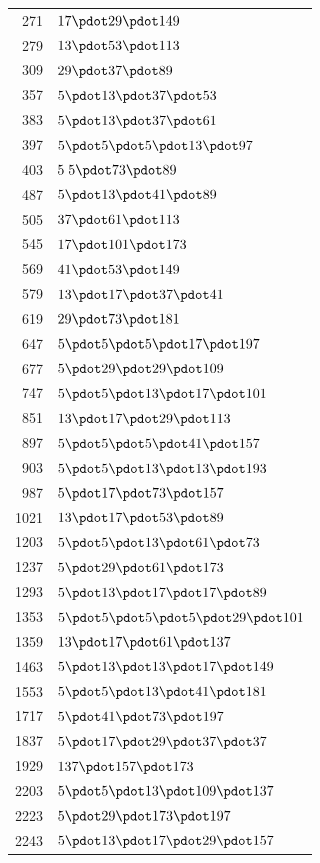 \begin{longtable}{@{}r|l@{}}
271 & $17\pdot 29\pdot 149$\\
279 & $13\pdot 53\pdot 113$\\
309 & $29\pdot 37\pdot 89$\\
357 & $5\pdot 13\pdot 37\pdot 53$\\
383 & $5\pdot 13\pdot 37\pdot 61$\\
397 & $5\pdot 5\pdot 5\pdot 13\pdot 97$\\
403 & $5\;5\pdot 73\pdot 89$\\
487 & $5\pdot 13\pdot 41\pdot 89$\\
505 & $37\pdot 61\pdot 113$\\
545 & $17\pdot 101\pdot 173$\\
569 & $41\pdot 53\pdot 149$\\
579 & $13\pdot 17\pdot 37\pdot 41$\\
619 & $29\pdot 73\pdot 181$\\
647 & $5\pdot 5\pdot 5\pdot 17\pdot 197$\\
677 & $5\pdot 29\pdot 29\pdot 109$\\
747 & $5\pdot 5\pdot 13\pdot 17\pdot 101$\\
851 & $13\pdot 17\pdot 29\pdot 113$\\
897 & $5\pdot 5\pdot 5\pdot 41\pdot 157$\\
903 & $5\pdot 5\pdot 13\pdot 13\pdot 193$\\
987 & $5\pdot 17\pdot 73\pdot 157$\\
1021 & $13\pdot 17\pdot 53\pdot 89$\\
1203 & $5\pdot 5\pdot 13\pdot 61\pdot 73$\\
1237 & $5\pdot 29\pdot 61\pdot 173$\\
1293 & $5\pdot 13\pdot 17\pdot 17\pdot 89$\\
1353 & $5\pdot 5\pdot 5\pdot 5\pdot 29\pdot 101$\\
1359 & $13\pdot 17\pdot 61\pdot 137$\\
1463 & $5\pdot 13\pdot 13\pdot 17\pdot 149$\\
1553 & $5\pdot 5\pdot 13\pdot 41\pdot 181$\\
1717 & $5\pdot 41\pdot 73\pdot 197$\\
1837 & $5\pdot 17\pdot 29\pdot 37\pdot 37$\\
1929 & $137\pdot 157\pdot 173$\\
2203 & $5\pdot 5\pdot 13\pdot 109\pdot 137$\\
2223 & $5\pdot 29\pdot 173\pdot 197$\\
2243 & $5\pdot 13\pdot 17\pdot 29\pdot 157$\\

\end{longtable}

